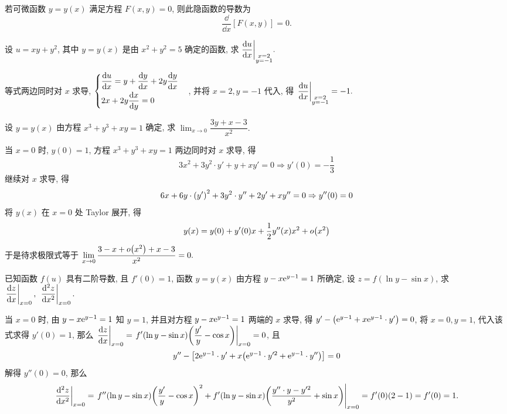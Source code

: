 \begin{theorem}[隐函数的导数]
    若可微函数 $y=y(x)$ 满足方程 $F(x,y)=0$, 则此隐函数的导数为
    $$\dfrac{\dd }{\dd x}[F(x,y)]=0.$$
\end{theorem}

\begin{example}
    设 $u=xy+y^2$, 其中 $y=y(x)$ 是由 $x^2+y^2=5$ 确定的函数, 求 $\displaystyle\dv{u}{x}\biggl |_{\substack{x=2\\y=-1}}.$
\end{example}
\begin{solution}
    等式两边同时对 $x$ 求导, $\begin{cases}
            \displaystyle \dv{u}{x}=y+\dv{y}{x}+2y\dv{y}{x} \\[6pt]
            \displaystyle 2x+2y\dv{x}{y} =0
        \end{cases}$, 并将 $x=2,y=-1$ 代入, 得 $\displaystyle\eval{\dv{u}{x}}_{\substack{x=2\\y=-1}}=-1.$
\end{solution}

\begin{example}
    设 $y=y(x)$ 由方程 $x^3+y^3+xy=1$ 确定, 求 $\displaystyle\lim_{x\to0}\dfrac{3y+x-3}{x^2}.$
\end{example}
\begin{solution}
    当 $x=0$ 时, $y(0)=1$, 
    方程 $x^3+y^3+xy=1$ 两边同时对 $x$ 求导, 得 $$3x^2+3y^2\cdot y'+y+xy'=0\Rightarrow y'(0)=-\dfrac{1}{3}$$
    继续对 $x$ 求导, 得 $$6x+6y\cdot\qty(y')^2+3y^2\cdot y''+2y'+xy''=0\Rightarrow y''(0)=0$$
    将 $y(x)$ 在 $x=0$ 处 Taylor 展开, 得
    $$y(x)=y(0)+y'(0)x+\dfrac{1}{2}y''(x)x^2+o\qty(x^2)$$
    于是待求极限式等于 $\displaystyle\lim_{x\to0}\dfrac{3-x+o\qty(x^2)+x-3}{x^2}=0.$
\end{solution}

\begin{example}[2007 数二]
    已知函数 $f(u)$ 具有二阶导数, 且 $f'(0)=1$, 函数 $y=y(x)$ 由方程 $y-x\mathrm{e} ^{y-1}=1$ 所确定, 设 $z=f(\ln y-\sin x)$, 求 $\displaystyle \eval{\dv{z}{x}}_{x=0},~\eval{\dv[2]{z}{x}}_{x=0}.$
\end{example}
\begin{solution}
    当 $x=0$ 时, 由 $y-x\mathrm{e} ^{y-1}=1$ 知 $y=1$, 并且对方程 $y-x\mathrm{e} ^{y-1}=1$ 两端的 $x$ 求导, 得 $y'-\qty(\mathrm{e} ^{y-1}+x\mathrm{e} ^{y-1}\cdot y')=0$, 将 $x=0,y=1$, 代入该式求得 $y'(0)=1$, 那么
    $\displaystyle \eval{\dv{z}{x}}_{x=0}=\eval{f'(\ln y-\sin x)\qty(\dfrac{y'}{y}-\cos x)}_{x=0}=0$, 且 $$y''-\qty[2\mathrm{e} ^{y-1}\cdot y'+x\qty(\mathrm{e} ^{y-1}\cdot y'^2+\mathrm{e} ^{y-1}\cdot y'')]=0$$
    解得 $y''(0)=0$, 那么
    $$\eval{\dv[2]{z}{x}}_{x=0}=\eval{f''(\ln y-\sin x)\qty(\dfrac{y'}{y}-\cos x)^2+f'(\ln y-\sin x)\qty(\dfrac{y''\cdot y-y'^2}{y^2}+\sin x)}_{x=0}=f'(0)(2-1)=f'(0)=1.$$
\end{solution}

